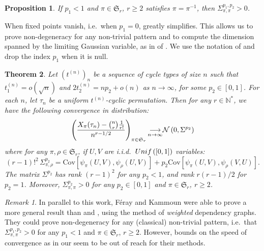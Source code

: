 \documentclass{article}
\newtheorem{theorem}{Theorem}[section]
\newtheorem{prop}[theorem]{Proposition}
\theoremstyle{remark}
\newtheorem{rem}{Remark}
\def\N{\mathbb{N}}
\def\m{\!-\!}
\newcommand{\cv}[2]{\underset{#1\to#2}{\longrightarrow}}
\newcommand{\cov}[2]{\mathrm{Cov}\left[#1,#2\right]}
\newcommand{\Unif}[1]{{\rm Unif}\left(#1\right)}
\newcommand{\Normal}[2]{{\cal N}\left(#1 , #2\right)}
\def\S{\mathfrak{S}}
\begin{document}
\begin{prop}\label{prop: non degenerate involution pattern}
    If $p_1<1$ and $\pi\in\S_r$, $r\ge2$ satisfies $\pi=\pi^{-1}$, then $\Sigma_{\pi,\pi}^{p_1,p_2} >0$.
\end{prop}

When fixed points vanish, i.e.~when $p_1=0$,  greatly simplifies.
This allows us to prove non-degeneracy for any non-trivial pattern and to compute the dimension spanned by the limiting Gaussian variable, as in  of \cite{JNZ15}.
We use the notation of  and drop the index $p_1$ when it is null.

\begin{theorem}\label{th: pattern normality t-cyclic w/o fixed points}
    Let $(t^{(n)})_n$ be a sequence of cycle types of size $n$ such that $t_1^{(n)} = o(\sqrt{n})$ and $2t_2^{(n)} = n p_2 + o(n)$ as $n\to\infty$, for some $p_2\in[0,1]$.
    For each $n$, let $\tau_n$ be a uniform $t^{(n)}$-cyclic permutation.
    Then for any $r\in\N^*$, we have the following convergence in distribution:
    \begin{equation*}
        \left( \frac{X_\pi(\tau_n) - \binom{n}{r}\frac{1}{r!}}{n^{r-1/2}} \right)_{\pi\in\S_r}
        {\cv{n}{\infty}}
        \Normal{0}{\Sigma^{p_2}}
    \end{equation*}
    where for any $\pi,\rho\in\S_r$, if $U,V$ are i.i.d.~$\Unif{[0,1]}$ variables:
    \begin{equation*}
        (r\m1)!^2\, \Sigma_{\pi,\rho}^{p_2} = \cov{\psi_\pi(U,V)}{\psi_\rho(U,V)} + p_2\cov{\psi_\pi(U,V)}{\psi_\rho(V,U)} .
    \end{equation*}
    The matrix $\Sigma^{p_2}$ has rank $(r\m1)^2$ for any $p_2<1$, and rank $r(r\m1)/2$ for $p_2=1$.
    Moreover, $\Sigma_{\pi,\pi}^{p_2}>0$ for any $p_2\in[0,1]$ and $\pi\in\S_r$, $r\ge2$.
\end{theorem}

\begin{rem}
    In parallel to this work, F\'eray and Kammoun \cite{FK23} were able to prove a more general result than  and , using the method of {\em weighted} dependency graphs.
    They could prove non-degeneracy for any (classical) non-trivial pattern, i.e.~that $\Sigma_{\pi,\pi}^{p_1,p_2} >0$ for any $p_1<1$ and $\pi\in\S_r$, $r\ge2$.
    However, bounds on the speed of convergence as in our  seem to be out of reach for their methods.
\end{rem}
\end{document}
